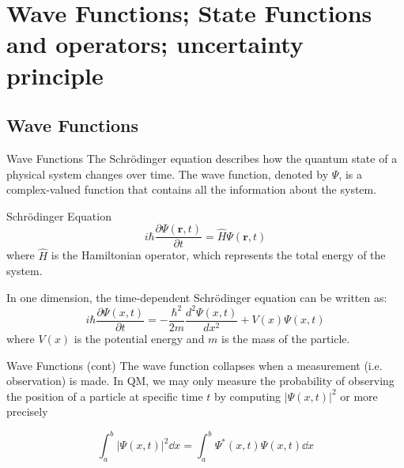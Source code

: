 
\section[Wave Functions]{Wave Functions; State Functions and operators; uncertainty principle}
\subsection{Wave Functions}

\begin{frame}{Wave Functions}
	The Schrödinger equation describes how the quantum state of a physical system changes over time. The wave function, denoted by $\Psi$, is a complex-valued function that contains all the information about the system.

	\begin{block}{Schrödinger Equation}
		\begin{equation*}
			i\hbar \frac{\partial \Psi(\mathbf{r}, t)}{\partial t} = \hat{H} \Psi(\mathbf{r}, t)
		\end{equation*}
		where $\hat{H}$ is the Hamiltonian operator, which represents the total energy of the system.

		In one dimension, the time-dependent Schrödinger equation can be written as:
		\begin{equation}
			\label{eq:TDSE}
			i\hbar \frac{\partial \Psi(x, t)}{\partial t} = -\frac{\hbar^2}{2m} \frac{d^2 \Psi(x, t)}{dx^2} + V(x) \Psi(x, t)
		\end{equation}
		where $V(x)$ is the potential energy and $m$ is the mass of the particle.

	\end{block}

\end{frame}

\begin{frame}{Wave Functions (cont)}
	The wave function collapses when a measurement (i.e. observation) is made.
	In QM, we may only measure the probability of observing the position of a particle at specific time $t$ by computing $|\Psi(x,t)|^2$ or more precisely
	\begin{block}

		\[
			\int_a^b |\Psi(x,t)|^2 \dd{x} = \int_a^b \Psi^*(x,t) \Psi(x,t) \dd{x}
		\]

	\end{block}
\end{frame}

